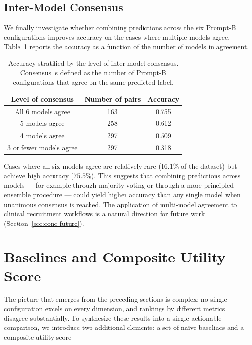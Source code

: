 \subsection{Inter-Model Consensus}
\label{subsec:res-consensus}

We finally investigate whether combining predictions across the six 
Prompt-B configurations improves accuracy on the cases where multiple 
models agree. Table~\ref{tab:res-consensus} reports the accuracy as a 
function of the number of models in agreement.

\begin{table}[htbp]
    \centering
    \caption{Accuracy stratified by the level of inter-model consensus. 
        Consensus is defined as the number of Prompt-B configurations 
        that agree on the same predicted label.}
    \label{tab:res-consensus}
    \small
    \begin{tabular}{@{}ccc@{}}
        \toprule
        \textbf{Level of consensus} & 
        \textbf{Number of pairs} & 
        \textbf{Accuracy} \\
        \midrule
        All 6 models agree      & 163 & 0.755 \\
        5 models agree          & 258 & 0.612 \\
        4 models agree          & 297 & 0.509 \\
        3 or fewer models agree & 297 & 0.318 \\
        \bottomrule
    \end{tabular}
\end{table}

Cases where all six models agree are relatively rare (16.1\% of the 
dataset) but achieve high accuracy ($75.5\%$). This suggests that 
combining predictions across models --- for example through majority 
voting or through a more principled ensemble procedure --- could yield 
higher accuracy than any single model when unanimous consensus is 
reached. The application of multi-model agreement to clinical 
recruitment workflows is a natural direction for future work 
(Section~\ref{sec:conc-future}).
\section{Baselines and Composite Utility Score}
\label{sec:res-baselines}

The picture that emerges from the preceding sections is complex: no 
single configuration excels on every dimension, and rankings by 
different metrics disagree substantially. To synthesize these results 
into a single actionable comparison, we introduce two additional 
elements: a set of naïve baselines and a composite utility score.

